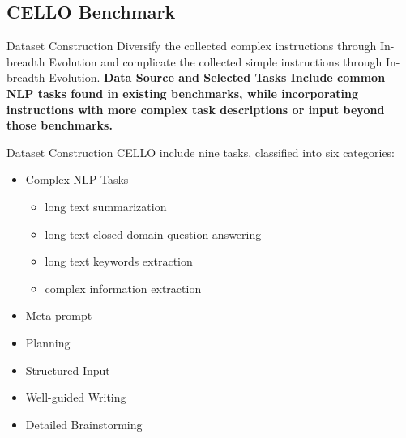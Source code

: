 \documentclass{beamer}
\begin{document}
\subsection{CELLO Benchmark}

\begin{frame}{Dataset Construction}
    Diversify the collected complex instructions through In-breadth Evolution and complicate the collected simple instructions through In-breadth Evolution.
    \newline
    \large\bfseries{Data Source and Selected Tasks}
    \newline
    \normalfont
    Include common NLP tasks found in existing benchmarks, while incorporating instructions with more complex task descriptions or input beyond those benchmarks.
\end{frame}

\begin{frame}{Dataset Construction}
    CELLO include nine tasks, classified into six categories:
    \begin{itemize}
        \item {Complex NLP Tasks}
            \begin{itemize}
                \item {long text summarization}
                \item {long text closed-domain question answering}
                \item {long text keywords extraction}
                \item {complex information extraction}
            \end{itemize}
        \item {Meta-prompt}
        \item {Planning}
        \item {Structured Input}
        \item {Well-guided Writing}
        \item {Detailed Brainstorming}
    \end{itemize}
\end{frame}
\end{document}

